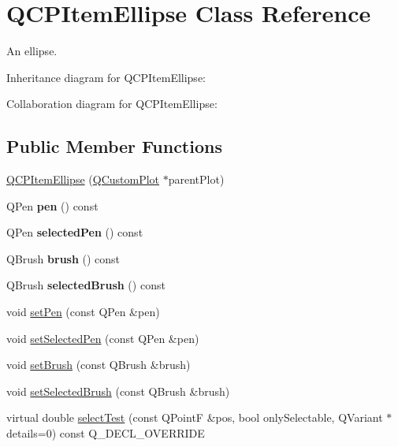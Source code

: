 \hypertarget{classQCPItemEllipse}{}\section{Q\+C\+P\+Item\+Ellipse Class Reference}
\label{classQCPItemEllipse}


An ellipse.  




Inheritance diagram for Q\+C\+P\+Item\+Ellipse\+:


Collaboration diagram for Q\+C\+P\+Item\+Ellipse\+:
\subsection*{Public Member Functions}
\begin{DoxyCompactItemize}
\item 
\hyperlink{classQCPItemEllipse_a759b77ef002515eba0263b5447ecb3fb}{Q\+C\+P\+Item\+Ellipse} (\hyperlink{classQCustomPlot}{Q\+Custom\+Plot} $\ast$parent\+Plot)
\item 
Q\+Pen {\bfseries pen} () const \hypertarget{classQCPItemEllipse_adb67471eabaf1214c99767f1653ca0ed}{}\label{classQCPItemEllipse_adb67471eabaf1214c99767f1653ca0ed}

\item 
Q\+Pen {\bfseries selected\+Pen} () const \hypertarget{classQCPItemEllipse_ac52ab52225d238365ff3264b4b69130f}{}\label{classQCPItemEllipse_ac52ab52225d238365ff3264b4b69130f}

\item 
Q\+Brush {\bfseries brush} () const \hypertarget{classQCPItemEllipse_ac012e4fd59fdb1afb6554937bae8f7e1}{}\label{classQCPItemEllipse_ac012e4fd59fdb1afb6554937bae8f7e1}

\item 
Q\+Brush {\bfseries selected\+Brush} () const \hypertarget{classQCPItemEllipse_a0043e401a912d54ea3195bab0967b394}{}\label{classQCPItemEllipse_a0043e401a912d54ea3195bab0967b394}

\item 
void \hyperlink{classQCPItemEllipse_adb81a663ed2420fcfa011e49f678d1a6}{set\+Pen} (const Q\+Pen \&pen)
\item 
void \hyperlink{classQCPItemEllipse_a6c542fba1dc918041c583f58a50dde99}{set\+Selected\+Pen} (const Q\+Pen \&pen)
\item 
void \hyperlink{classQCPItemEllipse_a49fc74e6965834e873d027d026def798}{set\+Brush} (const Q\+Brush \&brush)
\item 
void \hyperlink{classQCPItemEllipse_a9693501cfaa43a099655c75bed0dab3f}{set\+Selected\+Brush} (const Q\+Brush \&brush)
\item 
virtual double \hyperlink{classQCPItemEllipse_ab6e2b8a29695c606c7731e498297ca29}{select\+Test} (const Q\+PointF \&pos, bool only\+Selectable, Q\+Variant $\ast$details=0) const Q\+\_\+\+D\+E\+C\+L\+\_\+\+O\+V\+E\+R\+R\+I\+DE
\end{DoxyCompactItemize}
